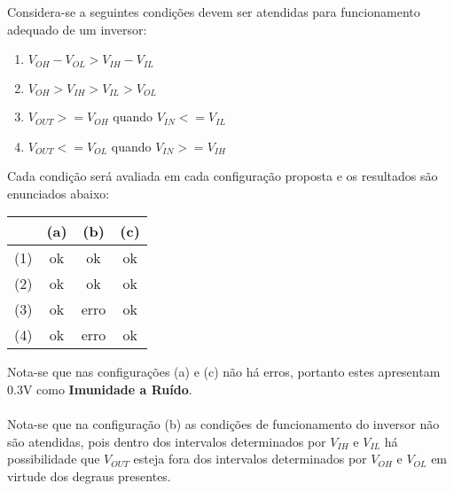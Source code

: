 \documentclass{article}
\begin{document}
            \begin{resolution}
                Considera-se a seguintes condições devem ser atendidas para funcionamento adequado de um inversor:
                    \begin{enumerate}[noitemsep]
                        \item $V_{OH} - V_{OL} > V_{IH} - V_{IL}$
                        \item $V_{OH} > V_{IH} > V_{IL} > V_{OL}$
                        \item $V_{OUT} >= V_{OH}$ quando $V_{IN} <= V_{IL}$
                        \item $V_{OUT} <= V_{OL}$ quando $V_{IN} >= V_{IH}$
                    \end{enumerate}
                Cada condição será avaliada em cada configuração proposta e os resultados são enunciados abaixo:
                    \begin{table}[H]
                        \centering  
                        \begin{tabular}[]{l ccc}\hline
                                & (a) & (b)  & (c)\\\hline
                            (1) & ok  & ok   & ok\\
                            (2) & ok  & ok   & ok\\
                            (3) & ok  & erro & ok\\
                            (4) & ok  & erro & ok\\\hline
                        \end{tabular}
                    \end{table}
                Nota-se que nas configurações (a) e (c) não há erros, portanto estes apresentam 0.3V como \textbf{Imunidade a Ruído}.\\\\
                Nota-se que na configuração (b) as condições de funcionamento do inversor não são atendidas, pois dentro dos intervalos determinados por $V_{IH}$ e $V_{IL}$ há possibilidade que $V_{OUT}$ esteja fora dos intervalos determinados por $V_{OH}$ e $V_{OL}$ em virtude dos degraus presentes.
            \end{resolution}

\newpage
\end{document}
